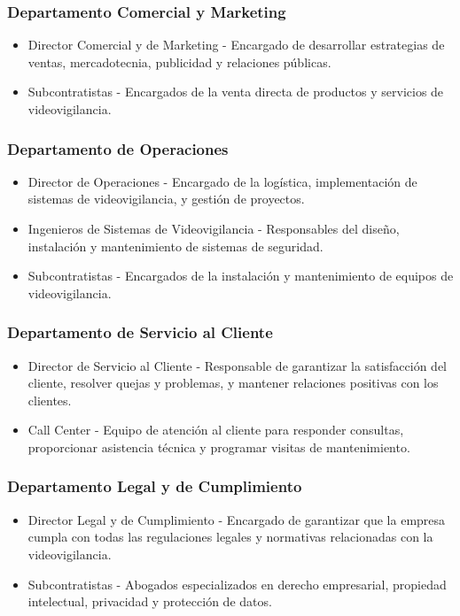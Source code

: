 \documentclass{report}
\begin{document}
            \subsubsection*{Departamento Comercial y Marketing}
              \begin{itemize}
              \item Director Comercial y de Marketing - Encargado de desarrollar estrategias de ventas, mercadotecnia, publicidad y relaciones públicas.
              \item Subcontratistas - Encargados de la venta directa de productos y servicios de videovigilancia.
              \end{itemize}
            \subsubsection*{Departamento de Operaciones}
              \begin{itemize}
              \item Director de Operaciones - Encargado de la logística, implementación de sistemas de videovigilancia, y gestión de proyectos.
              \item Ingenieros de Sistemas de Videovigilancia - Responsables del diseño, instalación y mantenimiento de sistemas de seguridad.
              \item Subcontratistas - Encargados de la instalación y mantenimiento de equipos de videovigilancia.
              \end{itemize}
            \subsubsection*{Departamento de Servicio al Cliente}
              \begin{itemize}
              \item Director de Servicio al Cliente - Responsable de garantizar la satisfacción del cliente, resolver quejas y problemas, y mantener relaciones positivas con los clientes.
              \item Call Center - Equipo de atención al cliente para responder consultas, proporcionar asistencia técnica y programar visitas de mantenimiento.
              \end{itemize}
            \subsubsection*{Departamento Legal y de Cumplimiento}
              \begin{itemize}
              \item Director Legal y de Cumplimiento - Encargado de garantizar que la empresa cumpla con todas las regulaciones legales y normativas relacionadas con la videovigilancia.
              \item Subcontratistas - Abogados especializados en derecho empresarial, propiedad intelectual, privacidad y protección de datos.
              \end{itemize}
\end{document}

